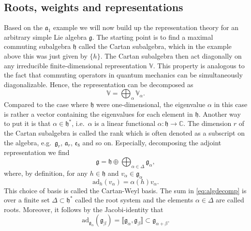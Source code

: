 \subsection{Roots, weights and representations}
Based on the $\mathfrak{a}_1$ example we will now build up the representation theory for an arbitrary simple Lie algebra $\mathfrak{g}$. The starting point is to find a maximal commuting subalgebra $\mathfrak{h}$ called the Cartan subalgebra, which in the example above this was just given by $\{h\}$. The Cartan subalgebra then act diagonally on any irreducible finite-dimensional representation $\mathbb{V}$. This property is analogous to the fact that commuting operators in quantum mechanics can be simultaneously diagonalizable. Hence, the representation can be decomposed as 
\begin{equation}
    \mathbb{V} = \bigoplus_\alpha \mathbb{V}_\alpha.
\end{equation}
Compared to the case where $\mathfrak{h}$ were one-dimensional, the eigenvalue $\alpha$ in this case is rather a vector containing the eigenvalues for each element in $\mathfrak{h}$. Another way to put it is that $\alpha\in \mathfrak{h}^*$, i.e.\ $\alpha$ is a linear functional $\alpha:\mathfrak{h}\to \mathbb{C}$. The dimension $r$ of the Cartan subalgebra is called the rank which is often denoted as a subscript on the algebra, e.g.\ $\mathfrak{g}_r$, $\mathfrak{a}_r$, $\mathfrak{e}_8$ and so on. Especially, decomposing the adjoint representation we find
\begin{equation}\label{eq:algdecomp}
    \mathfrak{g} = \mathfrak{h}\oplus\bigoplus_{\alpha\in\Delta} \mathfrak{g}_\alpha,
\end{equation}
where, by definition, for any $h\in\mathfrak{h}$ and $v_\alpha\in\mathfrak{g}_\alpha$ 
\begin{equation}
    \text{ad}_h(v_\alpha) = \alpha(h)v_\alpha.
\end{equation}
This choice of basis is called the Cartan-Weyl basis. The sum in \eqref{eq:algdecomp} is over a finite set $\Delta\subset\mathfrak{h}^*$ called the root system and the elements $\alpha\in\Delta$ are called roots. Moreover, it follows by the Jacobi-identity that 
\begin{equation}
    \text{ad}_{\mathfrak{g}_\alpha}(\mathfrak{g}_\beta) = \llbracket\mathfrak{g}_\alpha,\mathfrak{g}_\beta\rrbracket \subset \mathfrak{g}_{\alpha+\beta}.
\end{equation}
